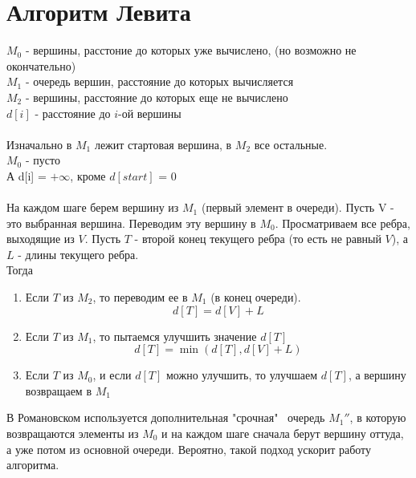 \documentclass[discrete.tex]{subfiles}
\begin{document}
\section{Алгоритм Левита}

\begin{definition}
    $M_0 $  - вершины,
    расстоние до которых уже вычислено, (но возможно не окончательно)\\
    $M_1$ - очередь вершин, расстояние до которых вычисляется\\
    $M_2$ - вершины, расстояние до которых еще не вычислено\\
    $d[i]$ - расстояние до $i$-ой вершины\\
    \\
    Изначально в $M_1$ лежит стартовая вершина, в $M_2$ все остальные.\\
    $M_0$ - пусто\\
    А d[i] = $+\infty$, кроме $d[start]$ = 0\\
    \\
    На каждом шаге берем вершину из $M_1$ (первый элемент в очереди). Пусть V -
    это выбранная вершина. Переводим эту вершину в $M_0$. Просматриваем все ребра,
    выходящие из $V$. Пусть $T$ - второй конец текущего ребра (то есть не равный $V$),
    а $L$ - длины текущего ребра.\\

    Тогда
    \begin{enumerate}
        \item Если $T$ из $M_2$, то переводим ее в $M_1$ (в конец очереди).
            \[d[T] = d[V] + L\]
        \item Если $T$ из $M_1$, то пытаемся улучшить значение $d[T]$
            \[d[T] = \min(d[T], d[V] + L)\]
        \item Если $T$ из $M_0$, и если $d[T]$ можно улучшить, то улучшаем $d[T]$, а
            вершину возвращаем в $M_1$
    \end{enumerate}
    В Романовском используется дополнительная "срочная" \  очередь $M_1''$, в которую
    возвращаются элементы из $M_0$ и на каждом шаге сначала берут вершину оттуда, а уже
    потом из основной очереди. Вероятно, такой подход ускорит работу алгоритма.
\end{definition}
\end{document}
